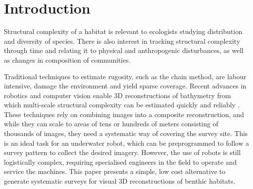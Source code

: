 \section{Introduction} 
\cite{Williams_2012}
\cite{Friedman_2012} \cite{Dustan_2013}
Structural complexity of a habitat is relevant to ecologists studying distribution and diversity of species. There is also interest in tracking structural complexity through time and relating it to physical and anthropogenic disturbances, as well as changes in composition of communities. 

Traditional techniques to estimate rugosity, such as the chain method, are labour intensive, damage the environment and yield sparse coverage. Recent advances in robotics and computer vision enable 3D reconstructions of bathymetry from which multi-scale structural complexity can be estimated quickly and reliably \cite{Friedman_2012}. These techniques rely on combining images into a composite reconstruction, and while they can scale to areas of tens or hundreds of meters consisting of thousands of images, they need a systematic way of covering the survey site. This is an ideal task for an underwater robot, which can be preprogrammed to follow a survey pattern to collect the desired imagery. However, the use of robots is still logistically complex, requiring specialised engineers in the field to operate and service the machines.
This paper presents a simple, low cost alternative to generate systematic surveys for visual 3D reconstructions of benthic habitats. 



